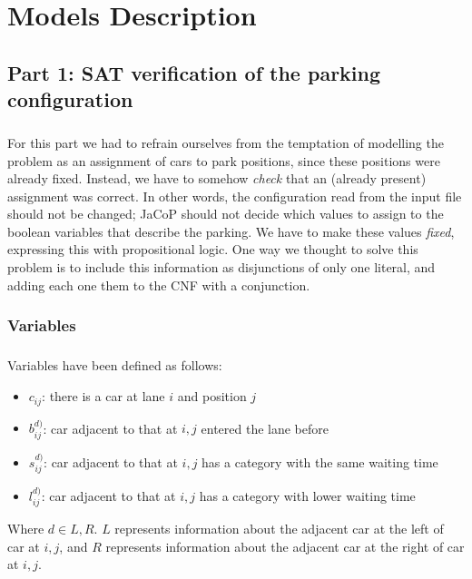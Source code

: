 \chapter{Models Description}
\label{chapter: models description}









\section{Part 1: SAT verification of the parking configuration}

\paragraph{}
For this part we had to refrain ourselves from the temptation of modelling the problem as an assignment of cars to park positions, since these positions were already fixed. Instead, we have to somehow \textit{check} that an (already present) assignment was correct. In other words, the configuration read from the input file should not be changed; JaCoP should not decide which values to assign to the boolean variables that describe the parking. We have to make these values \textit{fixed}, expressing this with propositional logic. One way we thought to solve this problem is to include this information as disjunctions of only one literal, and adding each one them to the CNF with a conjunction.

\subsection{Variables}

\paragraph{}
Variables have been defined as follows:
\begin{itemize}
  \item $c_{ij}$: there is a car at lane $i$ and position $j$
  \item $b^{d)}_{ij}$: car adjacent to that at $i,j$ entered the lane before
  \item $s^{d)}_{ij}$: car adjacent to that at $i,j$ has a category with the same waiting time 
  \item $l^{d)}_{ij}$: car adjacent to that at $i,j$ has a category with lower waiting time
\end{itemize}
Where $d \in {L,R}$. $L$ represents information about the adjacent car at the left of car at $i,j$, and $R$ represents information about the adjacent car at the right of car at $i,j$.


